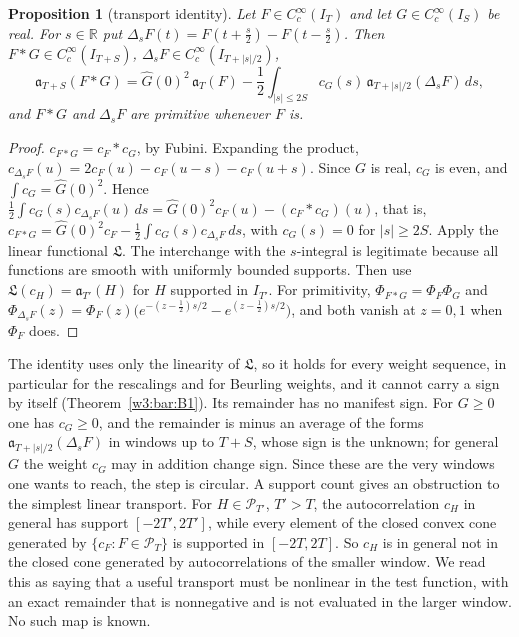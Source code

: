 \documentclass[11pt]{amsart}
\newtheorem{proposition}[theorem]{Proposition}
\theoremstyle{definition}
\theoremstyle{remark}
\numberwithin{equation}{section}
\newcommand{\R}{\mathbb{R}}
\newcommand{\IT}{I_T}                                  %
\newcommand{\cF}{c_F}                                  %
\newcommand{\PhiF}{\Phi_F}                             %
\newcommand{\PT}{\mathcal{P}_T}                        %
\newcommand{\aT}{\mathfrak{a}_T}                       %
\begin{document}
\begin{proposition}[transport identity]\label{w8:prop:transport}
Let $F\in C_c^\infty(\IT)$ and let $G\in C_c^\infty(I_S)$ be real. For $s\in\R$ put
$\Delta_sF(t)=F(t+\tfrac s2)-F(t-\tfrac s2)$. Then $F*G\in C_c^\infty(I_{T+S})$, $\Delta_sF\in C_c^\infty(I_{T+|s|/2})$,
\begin{equation}\label{w8:eq:transport}
  \mathfrak a_{T+S}(F*G)=\widehat G(0)^2\,\aT(F)-\frac12\int_{|s|\le2S}c_G(s)\,\mathfrak a_{T+|s|/2}(\Delta_sF)\,ds,
\end{equation}
and $F*G$ and $\Delta_sF$ are primitive whenever $F$ is.
\end{proposition}

\begin{proof}
$c_{F*G}=\cF*c_G$, by Fubini. Expanding the product,
$c_{\Delta_sF}(u)=2\cF(u)-\cF(u-s)-\cF(u+s)$. Since $G$ is real, $c_G$ is even, and $\int c_G=\widehat G(0)^2$. Hence
$\frac12\int c_G(s)c_{\Delta_sF}(u)\,ds=\widehat G(0)^2\cF(u)-(\cF*c_G)(u)$, that is,
$c_{F*G}=\widehat G(0)^2\cF-\frac12\int c_G(s)c_{\Delta_sF}\,ds$, with $c_G(s)=0$ for $|s|\ge2S$. Apply the linear
functional $\mathfrak L$. The interchange with the $s$-integral is legitimate because all functions are smooth with
uniformly bounded supports. Then use $\mathfrak L(c_H)=\mathfrak a_{T'}(H)$ for $H$ supported in $I_{T'}$. For
primitivity, $\Phi_{F*G}=\PhiF\Phi_G$ and
$\Phi_{\Delta_sF}(z)=\PhiF(z)\bigl(e^{-(z-\frac12)s/2}-e^{(z-\frac12)s/2}\bigr)$, and both vanish at $z=0,1$ when
$\PhiF$ does.
\end{proof}

The identity uses only the linearity of $\mathfrak L$, so it holds for every weight sequence, in particular for
the rescalings and for Beurling weights, and it cannot carry a sign by itself (Theorem~\ref{w3:bar:B1}). Its
remainder has no manifest sign. For $G\ge0$ one has $c_G\ge0$, and the remainder is minus an average of the
forms $\mathfrak a_{T+|s|/2}(\Delta_sF)$ in windows up to $T+S$, whose sign is the unknown; for general $G$ the
weight $c_G$ may in addition change sign. Since these are the very windows one wants to reach, the step is
circular. A support count gives an obstruction to the simplest linear transport. For $H\in\mathcal P_{T'}$,
$T'>T$, the autocorrelation $c_H$ in general has support $[-2T',2T']$, while every element of the closed convex
cone generated by $\{\cF:F\in\PT\}$ is supported in $[-2T,2T]$. So $c_H$ is in general not in the closed cone
generated by autocorrelations of the smaller window. We read this as saying that a useful transport must be
nonlinear in the test function, with an exact remainder that is nonnegative and is not evaluated in the larger
window. No such map is known.
\end{document}
